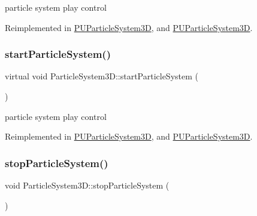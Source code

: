 particle system play control 

Reimplemented in \hyperlink{classPUParticleSystem3D_ab59c7cf4ca02cb3cac7f9d49d46312f1}{P\+U\+Particle\+System3D}, and \hyperlink{classPUParticleSystem3D_ac3ea37e1b73f622a72d7f2576118a551}{P\+U\+Particle\+System3D}.

\mbox{\label{classParticleSystem3D_a98d50249c6db65e0fb72dd7690965d83}} 
\subsubsection{\texorpdfstring{start\+Particle\+System()}{startParticleSystem()}\hspace{0.1cm}{\footnotesize\ttfamily [2/2]}}
{\footnotesize\ttfamily virtual void Particle\+System3\+D\+::start\+Particle\+System (\begin{DoxyParamCaption}{ }\end{DoxyParamCaption})\hspace{0.3cm}{\ttfamily [virtual]}}

particle system play control 

Reimplemented in \hyperlink{classPUParticleSystem3D_ab59c7cf4ca02cb3cac7f9d49d46312f1}{P\+U\+Particle\+System3D}, and \hyperlink{classPUParticleSystem3D_ac3ea37e1b73f622a72d7f2576118a551}{P\+U\+Particle\+System3D}.

\mbox{\label{classParticleSystem3D_a45c003e1eb2fc4d38ab74fd6231a7c47}} 
\subsubsection{\texorpdfstring{stop\+Particle\+System()}{stopParticleSystem()}\hspace{0.1cm}{\footnotesize\ttfamily [1/2]}}
{\footnotesize\ttfamily void Particle\+System3\+D\+::stop\+Particle\+System (\begin{DoxyParamCaption}{ }\end{DoxyParamCaption})\hspace{0.3cm}{\ttfamily [virtual]}}

